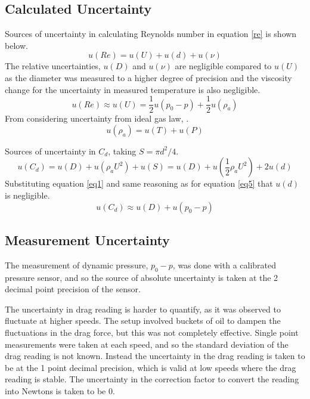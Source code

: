 \documentclass[8pt]{article}
\begin{document}
\subsection{Calculated Uncertainty}

Sources of uncertainty in calculating Reynolds number in equation \ref{re} is shown below.
\begin{equation}
    u(Re) = u(U) + u(d) + u(\nu)
\end{equation}
The relative uncertainties, $u(D)$ and $u(\nu)$ are negligible compared to $u(U)$ as the diameter was measured to a higher degree of precision and the viscosity change for the uncertainty in measured temperature is also negligible.
\begin{equation}
    u(Re) \approx u(U) = \frac{1}{2}u(p_0-p) + \frac{1}{2}u(\rho_a)
    \label{eq5}
\end{equation}
From considering uncertainty from ideal gas law, .
\begin{equation}
     u(\rho_a) = u(T) + u(P)
\end{equation}

Sources of uncertainty in $C_d$, taking $S=\pi d^2/4$.
\begin{equation}
    u(C_d) = u(D) + u(\rho_a U^2) + u(S) = u(D) + u(\frac{1}{2}\rho_a U^2) + 2u(d)
\end{equation}
Substituting equation \ref{eq1} and same reasoning as for equation \ref{eq5} that $u(d)$ is negligible.
\begin{equation}
    u(C_d) \approx u(D) + u(p_0-p)
\end{equation}


\subsection{Measurement Uncertainty}
The measurement of dynamic pressure, $p_0-p$, was done with a calibrated pressure sensor, and so the source of absolute uncertainty is taken at the 2 decimal point precision of the sensor.

The uncertainty in drag reading is harder to quantify, as it was observed to fluctuate at higher speeds.
The setup involved buckets of oil to dampen the fluctuations in the drag force, but this was not completely effective.
Single point measurements were taken at each speed, and so the standard deviation of the drag reading is not known.
Instead the uncertainty in the drag reading is taken to be at the 1 point decimal precision, which is valid at low speeds where the drag reading is stable.
The uncertainty in the correction factor to convert the reading into Newtons is taken to be 0.
\end{document}
